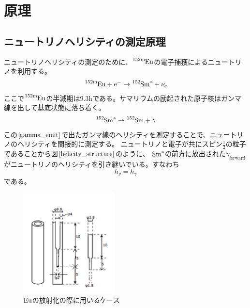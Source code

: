 \documentclass[dvipdfmx]{jreport}
\begin{document}
\chapter{原理}

\section{ニュートリノヘリシティの測定原理}
ニュートリノヘリシティの測定のために、$\ce{^{152\mathrm{m}}Eu}$の電子捕獲によるニュートリノを利用する。
\begin{equation}
  \label{EC}
  \ce{^{152\mathrm{m}}Eu} + \ce{e^{-}} \rightarrow \ce{^{152}Sm^{*}} + \nu_{e}
\end{equation}
ここで$\ce{^{152\mathrm{m}}Eu}$の半減期は$9.3\mathrm{h}$である。サマリウムの励起された原子核はガンマ線を出して基底状態に落ち着く。
\begin{equation}
  \label{gamma_emit}
  \ce{^{152}Sm^{*}} \rightarrow \ce{^{152}Sm} + \gamma
\end{equation}
この$\ref{gamma_emit}$で出たガンマ線のヘリシティを測定することで、ニュートリノのヘリシティを間接的に測定する。
ニュートリノと電子が共にスピン$\frac{1}{2}$の粒子であることから図$\ref{helicity_structure}$のように、
$\ce{Sm^{*}}$の前方に放出された$\gamma_{\mathrm{forward}}$がニュートリノのヘリシティを引き継いでいる。すなわち
\begin{equation}
  \label{helicity}
  h_{\nu} = h_{\gamma}
\end{equation}
である。
\begin{figure}[htbp]
  \begin{center}
    \includegraphics[width=50mm]{figure/case.png}
    \caption{$\ce{Eu}$の放射化の際に用いるケース \label{case}}
  \end{center}
\end{figure}
\end{document}
